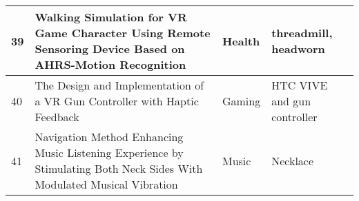 \begin{landscape}
\begin{table}[]
{\begin{tabular}{|l|l|l|l|}
				39                               & Walking Simulation for VR Game Character Using Remote Sensoring Device Based on AHRS-Motion Recognition                                   & Health                                   & threadmill, headworn                                                        \\ \hline
				40                               & The Design and Implementation of a VR Gun Controller with Haptic Feedback                                                                 & Gaming                                   & HTC VIVE and gun controller                                                 \\ \hline
				41                               & Navigation Method Enhancing Music Listening Experience by Stimulating Both Neck Sides With Modulated Musical Vibration                    & Music                                    & Necklace                                                                    \\ \hline
			\end{tabular}%
		}
	\end{table}
\end{landscape}